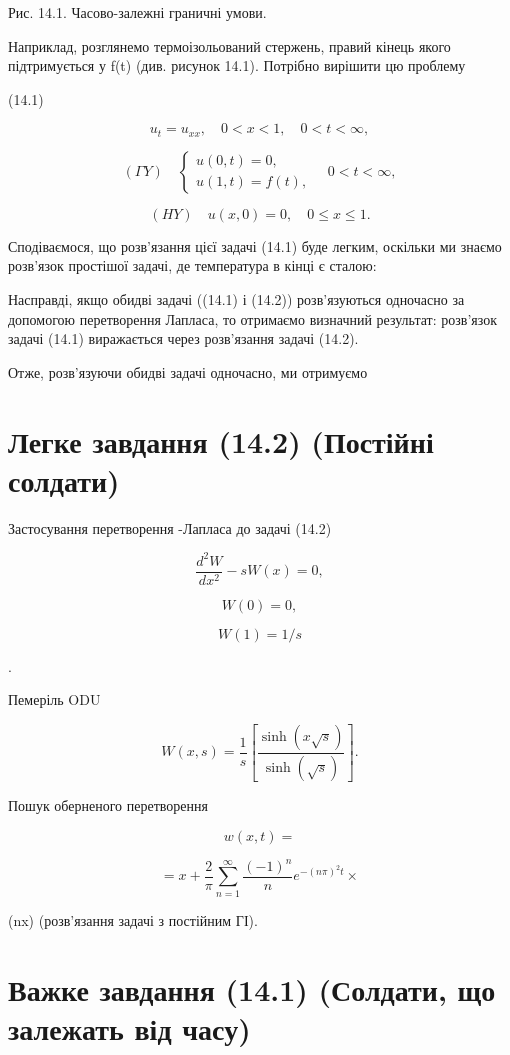 \documentclass[
  ukrainian,
]{article}
\begin{document}
Рис. 14.1. Часово-залежні граничні умови.

Наприклад, розглянемо термоізольований стержень, правий кінець якого
підтримується у f(t) (див. рисунок 14.1). Потрібно вирішити цю проблему

(14.1)

\[
u_{t} = u_{xx}, \quad 0 < x < 1, \quad 0 < t < \infty,
\]

\[
(\Gamma Y) \quad \begin{cases} u(0, t) = 0, \\ u(1, t) = f(t), \end{cases} \quad 0 < t < \infty,
\]

\[
(HY) \quad u(x, 0) = 0, \quad 0 \le x \le 1.
\]

Сподіваємося, що розв'язання цієї задачі (14.1) буде легким, оскільки ми
знаємо розв'язок простішої задачі, де температура в кінці є сталою:

Насправді, якщо обидві задачі ((14.1) і (14.2)) розв'язуються одночасно
за допомогою перетворення Лапласа, то отримаємо визначний результат:
розв'язок задачі (14.1) виражається через розв'язання задачі (14.2).

Отже, розв'язуючи обидві задачі одночасно, ми отримуємо

\section{Легке завдання (14.2) (Постійні
солдати)}\label{ux43bux435ux433ux43aux435-ux437ux430ux432ux434ux430ux43dux43dux44f-14.2-ux43fux43eux441ux442ux456ux439ux43dux456-ux441ux43eux43bux434ux430ux442ux438}

Застосування перетворення -Лапласа до задачі (14.2)

\[
\frac{d^2W}{dx^2} - sW(x) = 0,
\]

\[
W(0) = 0,
\]

\[
W(1) = 1/s
\]

.

Пемеріль ODU

\[
W(x, s) = \frac{1}{s} \left[ \frac{\sinh(x \sqrt{s})}{\sinh(\sqrt{s})} \right].
\]

Пошук оберненого перетворення

\[
w(x, t) =
\]

\[
= x + \frac{2}{\pi} \sum_{n=1}^{\infty} \frac{(-1)^n}{n} e^{-(n\pi)^2 t} \times
\]

\times \sin(n\pi x) (розв'язання задачі з постійним ГІ).

\section{Важке завдання (14.1) (Солдати, що залежать від
часу)}\label{ux432ux430ux436ux43aux435-ux437ux430ux432ux434ux430ux43dux43dux44f-14.1-ux441ux43eux43bux434ux430ux442ux438-ux449ux43e-ux437ux430ux43bux435ux436ux430ux442ux44c-ux432ux456ux434-ux447ux430ux441ux443}
\end{document}
